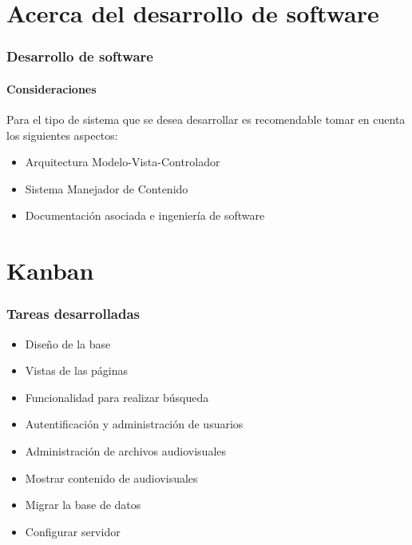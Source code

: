 \documentclass{beamer}
\begin{document}
\section{Acerca del desarrollo de software}
\begin{frame}
	\frametitle{Desarrollo de software}
	\framesubtitle{Consideraciones}
	Para el tipo de sistema que se desea desarrollar es recomendable tomar en cuenta los siguientes aspectos:
	\begin{itemize}
		\item Arquitectura Modelo-Vista-Controlador
		\item Sistema Manejador de Contenido
		\item Documentación asociada e ingeniería de software
	\end{itemize}
\end{frame}

\section{Kanban}
\begin{frame}
	\frametitle{Tareas desarrolladas}
	\begin{itemize}
		\item Diseño de la base
		\item Vistas de las páginas
		\item Funcionalidad para realizar búsqueda
		\item Autentificación y administración de usuarios
		\item Administración de archivos audiovisuales
		\item Mostrar contenido de audiovisuales
		\item Migrar la base de datos
		\item Configurar servidor
	\end{itemize}
\end{frame}
\end{document}
